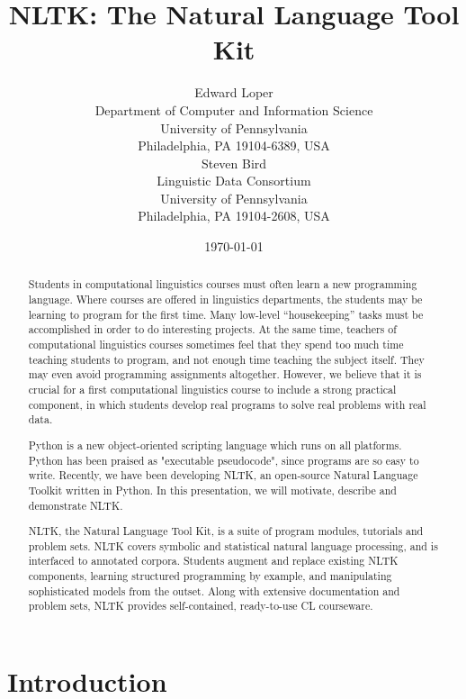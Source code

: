 \documentclass[11pt]{article}
\title{NLTK: The Natural Language Tool Kit}
\author{
\begin{tabular}[t]{c}
Edward Loper\\
Department of Computer and Information Science\\
University of Pennsylvania\\
Philadelphia, PA 19104-6389, USA
\end{tabular}
\hspace{6pt}
\begin{tabular}[t]{c}
Steven Bird\\
Linguistic Data Consortium\\
University of Pennsylvania\\
Philadelphia, PA 19104-2608, USA
\end{tabular}
}
\date{\today}
\begin{document}
\makeidpage
\maketitle

\begin{abstract}
Students in computational linguistics courses must often learn
a new programming language.  Where courses are offered in linguistics
departments, the students may be learning to program for the first time.
Many low-level ``housekeeping'' tasks must
be accomplished in order to do interesting projects.  At the same
time, teachers of computational linguistics courses sometimes feel
that they spend too much time teaching students to program, and not
enough time teaching the subject itself.  They may even avoid
programming assignments altogether.  However, we believe that it is
crucial for a first computational linguistics course to include a
strong practical component, in which students develop real programs to
solve real problems with real data.

Python is a new object-oriented scripting language which runs on all
platforms.  Python has been praised as "executable pseudocode", since
programs are so easy to write.  Recently, we have been developing
NLTK, an open-source Natural Language Toolkit written in Python.
In this presentation, we will motivate, describe and demonstrate NLTK.

NLTK, the Natural Language Tool Kit, is a suite of program modules,
tutorials and problem sets.  NLTK covers symbolic and statistical
natural language processing, and is interfaced to annotated corpora.
Students augment and replace existing NLTK components, learning
structured programming by example, and manipulating sophisticated
models from the outset.  Along with extensive documentation and
problem sets, NLTK provides self-contained, ready-to-use CL
courseware.
\end{abstract}

\section{Introduction}
\end{document}
